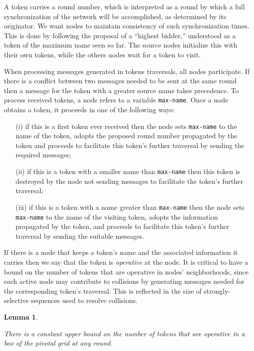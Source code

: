 \documentclass[11pt]{article}
\newtheorem{lemma}{Lemma}
\begin{document}
A token carries a round number, which is interpreted as a round by which a full synchronization of the network will be accomplished, as determined by its originator.
We want nodes to maintain consistency of such synchronization  times.
This is done by following the proposal of a ``highest bidder,'' understood as a token of the maximum name seen so far.
The source nodes initialize this with their own tokens, while the others nodes wait for a token to visit.

When processing messages generated in tokens traversals, all nodes participate.
If there is a conflict between two messages needed to be sent at the same round then a message for the token with a greater source name takes precedence.
To process received tokens, a node refers to a variable \texttt{max-name}.
Once a node obtains a token, it proceeds in one of the following ways:
\begin{enumerate}
\item[(i)] if this is a first  token ever received then the node sets \texttt{max-name} to the name of the token, adopts the proposed round number  propagated by the token and proceeds to facilitate this token's further traversal by sending the required messages;

\item[(ii)] if this is a  token with a smaller name than \texttt{max-name} then this token is destroyed by the node not sending messages to facilitate the token's further traversal;

\item[(iii)] if this is a token with a  name greater than \texttt{max-name} then the node sets \texttt{max-name} to the name of the visiting token, adopts the information propagated by the token, and proceeds to facilitate this token's further traversal by sending the suitable messages.
\end{enumerate}
If there is a node that keeps a token's name and the associated information it carries then we say that the token is \emph{operative} at the node.
It is critical to have a bound on the number of tokens that are operative in nodes' neighborhoods, since each active node may contribute to collisions by generating messages needed for the corresponding token's traversal.
This is reflected in the size of strongly-selective sequences used to resolve collisions.



\begin{lemma}
\label{lem:constant-number-of-tokens}

There is a constant upper bound on the number of  tokens that are operative in a box of the pivotal grid at any round.
\end{lemma}
\end{document}
